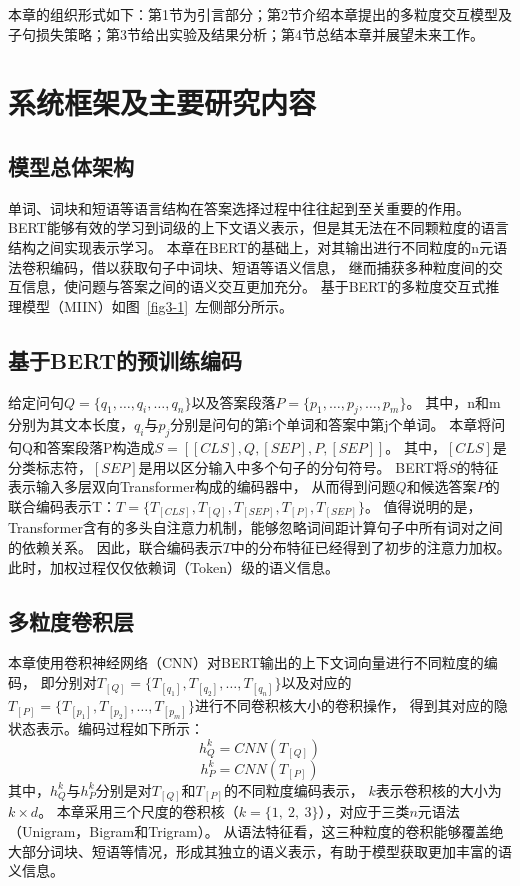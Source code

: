 本章的组织形式如下：第1节为引言部分；第2节介绍本章提出的多粒度交互模型及子句损失策略；第3节给出实验及结果分析；第4节总结本章并展望未来工作。

\section{系统框架及主要研究内容}

\subsection{模型总体架构}

单词、词块和短语等语言结构在答案选择过程中往往起到至关重要的作用。
BERT能够有效的学习到词级的上下文语义表示，但是其无法在不同颗粒度的语言结构之间实现表示学习。
本章在BERT的基础上，对其输出进行不同粒度的n元语法卷积编码，借以获取句子中词块、短语等语义信息，
继而捕获多种粒度间的交互信息，使问题与答案之间的语义交互更加充分。
基于BERT的多粒度交互式推理模型（MIIN）如图~\ref{fig3-1}~左侧部分所示。

\subsection{基于BERT的预训练编码}

给定问句$Q=\{q_1,\ldots,q_i,\ldots,q_n\}$以及答案段落$P=\{p_1,\ldots,p_j,\ldots,p_m\}$。
其中，n和m分别为其文本长度，$q_i$与$p_j$分别是问句的第i个单词和答案中第j个单词。
本章将问句Q和答案段落P构造成$S=[[CLS],Q,[SEP],P,[SEP]]$。
其中，$[CLS]$是分类标志符，$[SEP]$是用以区分输入中多个句子的分句符号。
BERT将$S$的特征表示输入多层双向Transformer\cite{vaswani2017attention}构成的编码器中，
从而得到问题$Q$和候选答案$P$的联合编码表示T：$T=\{T_{[CLS]},T_{[Q]},T_{[SEP]},T_{[P]},T_{[SEP]}\}$。
值得说明的是，Transformer含有的多头自注意力机制，能够忽略词间距计算句子中所有词对之间的依赖关系。
因此，联合编码表示$T$中的分布特征已经得到了初步的注意力加权。此时，加权过程仅仅依赖词（Token）级的语义信息。



\subsection{多粒度卷积层}

本章使用卷积神经网络（CNN）对BERT输出的上下文词向量进行不同粒度的编码，
即分别对$T_{[Q]}=\{T_{[q_1]},T_{[q_2]},\ldots,T_{[q_n]}\}$以及对应的
$T_{[P]}=\{T_{[p_1]},T_{[p_2]},\ldots,T_{[p_m]}\}$进行不同卷积核大小的卷积操作，
得到其对应的隐状态表示。编码过程如下所示：
\begin{equation}
    h_Q^k = CNN(T_{[Q]})
\end{equation}
\begin{equation}
    h_P^k = CNN(T_{[P]})
\end{equation}
其中，$h_Q^k$与$h_P^k$分别是对$T_{[Q]}$和$T_{[P]}$的不同粒度编码表示，
$k$表示卷积核的大小为$k\times d$。
本章采用三个尺度的卷积核（$k=\{1,\ 2,\ 3\}$），对应于三类$n$元语法（Unigram，Bigram和Trigram）。
从语法特征看，这三种粒度的卷积能够覆盖绝大部分词块、短语等情况，形成其独立的语义表示，有助于模型获取更加丰富的语义信息。

